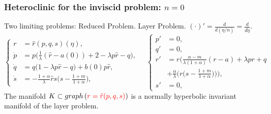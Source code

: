 \documentclass{beamer}
\def\red{\color{red}}
\begin{document}
\begin{frame}
 \frametitle{Heteroclinic for the inviscid problem: $n=0$}
 Two limiting problems:
   \vfill
  {\footnotesize
    \hspace{3em} {Reduced Problem.} \hspace{10em} Layer Problem. $(\cdot)' = \frac{d}{d(\eta/n)} = \frac{d}{d\tilde\eta}.$
\begin{equation*} %
 \left\{
 \begin{aligned}
 r&=\hat{r}(p,q,s)(\eta),\\
 \dot{p} &=p\Big(\frac{1}{\lambda}(\hat{r}-a(0)) + 2- \lambda p \hat{r} -q\Big),\\
 \dot{q} &=q\Big(1 -\lambda p \hat{r} -q\Big) + b(0) p \hat{r},\\
 \dot{s} &=- \frac{1+\alpha}{\lambda}\hat{r}s\big(s- \frac{1+m}{1+\alpha}\big),
 \end{aligned}\right.
 \quad  
 \left\{
 \begin{aligned}
 {p}' &=0,\\
 {q}' &=0,\\
 {r}' &=r\Big(\frac{\alpha-m}{\lambda(1+\alpha)}(r-a) + \lambda pr + q \\
 &+\frac{\alpha}{\lambda}\Big(r\big(s- \frac{1+m}{1+\alpha}\big)\Big)\Big),\\
 {s}' &=0, %
 \end{aligned}\right.
\end{equation*}
}
The manifold $K\subset graph\left({\red r=\hat{r}(p,q,s)}\right)$ is a normally hyperbolic invariant manifold of the layer problem.
\end{frame}
\end{document}
